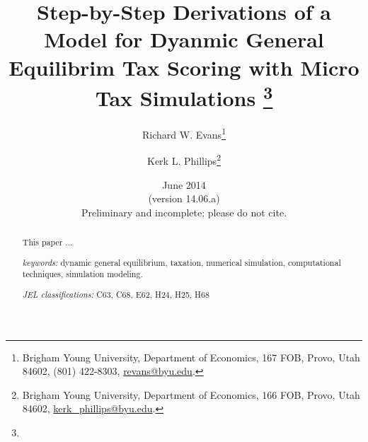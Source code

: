 \documentclass[letterpaper,12pt]{article}
\theoremstyle{definition}
\numberwithin{equation}{section}
\begin{document}
\begin{titlepage}
  \title{Step-by-Step Derivations of a Model for Dyanmic General Equilibrim Tax Scoring with Micro Tax Simulations
         \thanks{} }

  \author{ Richard W. Evans\footnote{Brigham Young University, Department of Economics, 167 FOB, Provo, Utah 84602, (801) 422-8303, \href{mailto:revans@byu.edu}{revans@byu.edu}.} \\[-2pt]
         \and
         Kerk L. Phillips\footnote{Brigham Young University, Department of Economics, 166 FOB, Provo, Utah 84602, \href{mailto:kerk_phillips@byu.edu}{kerk\_phillips@byu.edu}.} \\[-2pt]}
  \date{June 2014 \\
        \scriptsize{(version 14.06.a)}\\
        \small Preliminary and incomplete; please do not cite.}
  \maketitle
  \begin{abstract}
  \small{This paper ...

  \vspace{0.3in}

  \textit{keywords:} dynamic general equilibrium, taxation, numerical simulation, computational techniques, simulation modeling.

  \vspace{0.3in}

  \textit{JEL classifications:} C63, C68, E62, H24, H25, H68}
  \end{abstract}
  \thispagestyle{empty}
\end{titlepage}
\end{document}
